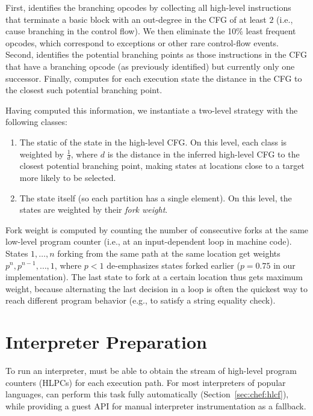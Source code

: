 First, \chef identifies the branching opcodes by collecting all high-level instructions that terminate a basic block with an out-degree in the CFG of at least $2$ (i.e., cause branching in the control flow).   We then eliminate the 10\% least frequent opcodes, which correspond to exceptions or other rare control-flow events.
%
Second, \chef identifies the potential branching points as those instructions in the CFG that have a branching opcode (as previously identified) but currently only one successor.
%
Finally, \chef computes for each execution state the distance in the CFG to the closest such potential branching point.

Having computed this information, we instantiate a two-level \cupa strategy with the following classes:
\begin{enumerate}
\item The static \hlpc of the state in the high-level CFG.  On this level, each class is weighted by $\frac{1}{d}$, where $d$ is the distance in the inferred high-level CFG to the closest potential branching point, making states at locations close to a target more likely to be selected.
\item The state itself (so each partition has a single element).  On this level, the states are weighted by their \textit{fork weight}.
\end{enumerate}

Fork weight is computed by counting the number of consecutive forks at the same low-level program counter (i.e., at an input-dependent loop in machine code).  States $1, \ldots, n$ forking from the same path at the same location get weights $p^n, p^{n-1}, \ldots, 1$, where $p < 1$ de-emphasizes states forked earlier ($p = 0.75$ in our implementation).  The last state to fork at a certain location thus gets maximum weight, because alternating the last decision in a loop is often the quickest way to reach different program behavior (e.g., to satisfy a string equality check).



\section{Interpreter Preparation}
\label{sec:chef:recipe}

To run an interpreter, \chef must be able to obtain the stream of high-level program counters (HLPCs) for each execution path.  For most interpreters of popular languages, \chef can perform this task fully automatically (Section~\ref{sec:chef:hlcf}), while providing a guest API for manual interpreter instrumentation as a fallback.

